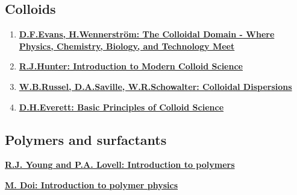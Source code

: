 \documentclass[
  letterpaper,
  enabledeprecatedfontcommands]{report}
\providecommand{\tightlist}{%
  \setlength{\itemsep}{0pt}\setlength{\parskip}{0pt}}
\begin{document}
\subsection*{Colloids}\label{colloids}

\begin{enumerate}
\def\labelenumi{(\arabic{enumi})}
\tightlist
\item
  \textbf{\href{https://bris.on.worldcat.org/search/detail/39129921?queryString=The\%20Colloidal\%20Domain&clusterResults=true&stickyFacetsChecked=true&groupVariantRecords=false&newsArticles=off&bookReviews=off}{D.F.Evans,
  H.Wennerström: The Colloidal Domain - Where Physics, Chemistry,
  Biology, and Technology Meet}}
\item
  \textbf{\href{https://bris.on.worldcat.org/search/detail/27810428?queryString=Introduction\%20to\%20Modern\%20Colloid\%20Science&clusterResults=true&stickyFacetsChecked=true&groupVariantRecords=false&newsArticles=off&bookReviews=off}{R.J.Hunter:
  Introduction to Modern Colloid Science}}
\item
  \textbf{\href{https://bris.on.worldcat.org/search/detail/18869758?queryString=colloidal\%20dispersions&clusterResults=true&stickyFacetsChecked=true&groupVariantRecords=false&newsArticles=off&bookReviews=off}{W.B.Russel,
  D.A.Saville, W.R.Schowalter: Colloidal Dispersions}}
\item
  \textbf{\href{https://bris.on.worldcat.org/search/detail/232632488?queryString=Basic\%20Principles\%20of\%20Colloid\%20Science&clusterResults=true&stickyFacetsChecked=true&groupVariantRecords=false&newsArticles=off&bookReviews=off}{D.H.Everett:
  Basic Principles of Colloid Science}}
\end{enumerate}

\subsection*{Polymers and surfactants}\label{polymers-and-surfactants}

\textbf{\href{https://bris.on.worldcat.org/search/detail/744914764?queryString=introduction\%20to\%20polymers&clusterResults=true&stickyFacetsChecked=true&groupVariantRecords=false&newsArticles=off&bookReviews=off}{R.J.
Young and P.A. Lovell: Introduction to polymers}}

\textbf{\href{https://bris.on.worldcat.org/search/detail/32465842?queryString=introduction\%20to\%20polymer\%20physics&clusterResults=true&stickyFacetsChecked=true&groupVariantRecords=false&newsArticles=off&bookReviews=off}{M.
Doi: Introduction to polymer physics}}
\end{document}
